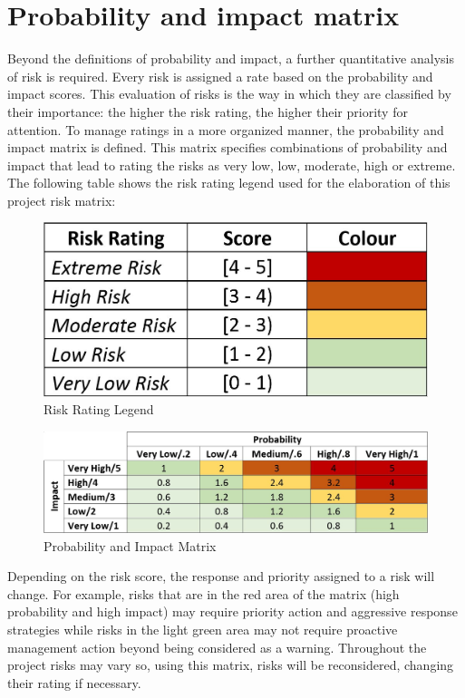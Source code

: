 \section{Probability and impact matrix}
Beyond the definitions of probability and impact, a further quantitative analysis of risk is required. Every risk is assigned a rate based on the probability and impact scores. This evaluation of risks is the way in which they are classified by their importance: the higher the risk rating, the higher their priority for attention. To manage ratings in a more organized manner, the probability and impact matrix is defined. This matrix specifies combinations of probability and impact that lead to rating the risks as very low, low, moderate, high or extreme. The following table shows the risk rating legend used for the elaboration of this project risk matrix:
\begin{figure}[H]
	\centering
	\includegraphics[width=0.5\linewidth]{./images/RiskRating}
	\caption[Probability and Impact Matrix]{Risk Rating Legend}
\end{figure}
\begin{figure}[H]
	\centering
	\includegraphics[width=\linewidth]{./images/Probability_and_impact_matrix}
	\caption[Probability and Impact Matrix]{Probability and Impact Matrix}
\end{figure}
Depending on the risk score, the response and priority assigned to a risk will change. For example, risks that are in the red area of the matrix (high probability and high impact) may require priority action and aggressive response strategies while risks in the light green area may not require proactive management action beyond being considered as a warning.
Throughout the project risks may vary so, using this matrix, risks will be reconsidered, changing their rating if necessary.
